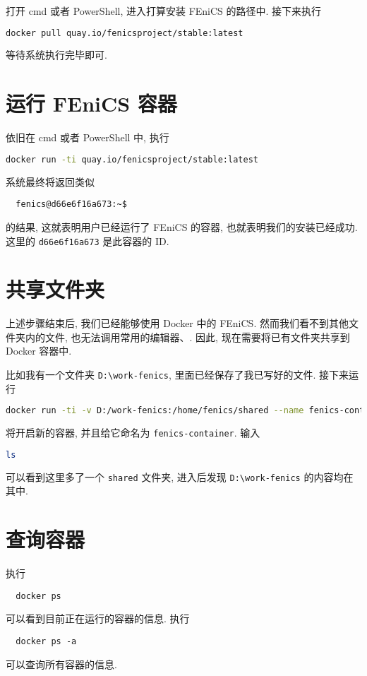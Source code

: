 \documentclass[fontset=founder]{ctexrep}
\begin{document}
打开 \textsf{cmd} 或者 \textsf{PowerShell},
进入打算安装 FEniCS 的路径中.
接下来执行
\begin{lstlisting}[language=bash]
  docker pull quay.io/fenicsproject/stable:latest
\end{lstlisting}
等待系统执行完毕即可.

\section{运行 FEniCS 容器}

依旧在 \textsf{cmd} 或者 \textsf{PowerShell} 中,
执行
\begin{lstlisting}[language=bash]
  docker run -ti quay.io/fenicsproject/stable:latest
\end{lstlisting}
系统最终将返回类似
\begin{lstlisting}
  fenics@d66e6f16a673:~$
\end{lstlisting}
的结果,
这就表明用户已经运行了 FEniCS 的容器,
也就表明我们的安装已经成功.
这里的 \texttt{d66e6f16a673} 是此容器的 ID.

\section{共享文件夹}\label{sec:shared-folder}

上述步骤结束后,
我们已经能够使用 Docker 中的 FEniCS.
然而我们看不到其他文件夹内的文件,
也无法调用常用的编辑器、.
因此,
现在需要将已有文件夹共享到 Docker 容器中.

比如我有一个文件夹 \texttt{D:\textbackslash work-fenics},
里面已经保存了我已写好的文件.
接下来运行
\begin{lstlisting}[language=bash]
  docker run -ti -v D:/work-fenics:/home/fenics/shared --name fenics-container quay.io/fenicsproject/stable:latest
\end{lstlisting}
将开启新的容器,
并且给它命名为 \texttt{fenics-container}.
输入
\begin{lstlisting}[language=bash]
  ls
\end{lstlisting}
可以看到这里多了一个 \texttt{shared} 文件夹,
进入后发现 \texttt{D:\textbackslash work-fenics} 的内容均在其中.

\section{查询容器}

执行
\begin{lstlisting}
  docker ps
\end{lstlisting}
可以看到目前正在运行的容器的信息.
执行
\begin{lstlisting}
  docker ps -a
\end{lstlisting}
可以查询所有容器的信息.
\end{document}
